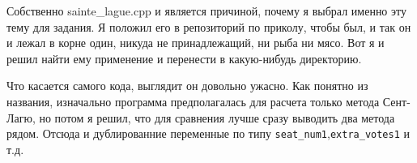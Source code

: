 Собственно sainte\_lague.cpp и является причиной, почему я выбрал именно эту тему для задания. Я положил его в репозиторий по приколу, чтобы был, и так он и лежал в корне один, никуда не принадлежащий, ни рыба ни мясо. Вот я и решил найти ему применение и перенести в какую-нибудь директорию.

Что касается самого кода, выглядит он довольно ужасно. Как понятно из названия, изначально программа предполагалась для расчета только метода Сент-Лагю, но потом я решил, что для сравнения лучше сразу выводить два метода рядом. Отсюда и дублированние переменные по типу \texttt{seat\_num1},\texttt{extra\_votes1} и т.д.

\inputminted[fontsize=\small, breaklines=true, style=borland, linenos]{cpp}{sainte_lague.cpp}